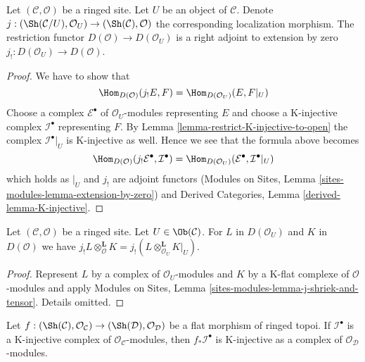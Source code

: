 \begin{lemma}
\label{lemma-adjoint-lower-shriek-restrict}
Let $(\mathcal{C}, \mathcal{O})$ be a ringed site. Let $U$ be an
object of $\mathcal{C}$. Denote
$j : (\Sh(\mathcal{C}/U), \mathcal{O}_U) \to (\Sh(\mathcal{C}), \mathcal{O})$
the corresponding localization morphism. The restriction functor
$D(\mathcal{O}) \to D(\mathcal{O}_U)$ is a right adjoint to
extension by zero $j_! : D(\mathcal{O}_U) \to D(\mathcal{O})$.
\end{lemma}

\begin{proof}
We have to show that
$$
\Hom_{D(\mathcal{O})}(j_!E, F) = \Hom_{D(\mathcal{O}_U)}(E, F|_U)
$$
Choose a complex $\mathcal{E}^\bullet$ of $\mathcal{O}_U$-modules
representing $E$ and choose
a K-injective complex $\mathcal{I}^\bullet$ representing $F$.
By Lemma \ref{lemma-restrict-K-injective-to-open} the complex
$\mathcal{I}^\bullet|_U$ is K-injective as well. Hence we see that
the formula above becomes
$$
\Hom_{D(\mathcal{O})}(j_!\mathcal{E}^\bullet, \mathcal{I}^\bullet) =
\Hom_{D(\mathcal{O}_U)}(\mathcal{E}^\bullet, \mathcal{I}^\bullet|_U)
$$
which holds as $|_U$ and $j_!$ are adjoint functors
(Modules on Sites, Lemma \ref{sites-modules-lemma-extension-by-zero})
and
Derived Categories, Lemma \ref{derived-lemma-K-injective}.
\end{proof}

\begin{lemma}
\label{lemma-j-shriek-and-tensor}
Let $(\mathcal{C}, \mathcal{O})$ be a ringed site. Let $U \in \Ob(\mathcal{C})$.
For $L$ in $D(\mathcal{O}_U)$ and $K$ in $D(\mathcal{O})$ we have
$j_!L \otimes_\mathcal{O}^\mathbf{L} K =
j_!(L \otimes_{\mathcal{O}_U}^\mathbf{L} K|_U)$.
\end{lemma}

\begin{proof}
Represent $L$ by a complex of $\mathcal{O}_U$-modules and $K$ by a K-flat
complexe of $\mathcal{O}$-modules and apply
Modules on Sites, Lemma \ref{sites-modules-lemma-j-shriek-and-tensor}.
Details omitted.
\end{proof}

\begin{lemma}
\label{lemma-K-injective-flat}
Let $f : (\Sh(\mathcal{C}), \mathcal{O}_\mathcal{C}) \to
(\Sh(\mathcal{D}), \mathcal{O}_\mathcal{D})$ be a flat morphism
of ringed topoi. If $\mathcal{I}^\bullet$ is a K-injective
complex of $\mathcal{O}_\mathcal{C}$-modules, then
$f_*\mathcal{I}^\bullet$ is K-injective
as a complex of $\mathcal{O}_\mathcal{D}$-modules.
\end{lemma}

